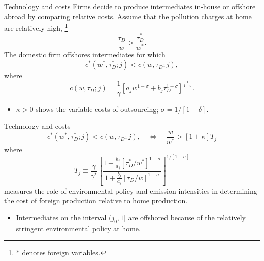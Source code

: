 \documentclass{beamer}
\begin{document}
\begin{frame}{Technology and costs}
	Firms decide to produce intermediates in-house or offshore abroad by comparing relative costs. Assume that the pollution charges at home are relatively high, \footnote{$*$ denotes foreign variables.}
	\begin{equation}
		\frac{\tau_D}{w}>\frac{\tau_D^*}{w^*}.
	\end{equation}
	\medskip
	The domestic firm offshores intermediates for which
	\begin{equation}
			[1+\kappa]c^*(w^*,\tau_D^*;j)<c(w,\tau_D;j),
	\end{equation}
	where
	\begin{equation}
		c(w,\tau_D;j) = \frac{1}{\gamma}\left[a_jw^{1-\sigma}+b_j\tau_D^{1-\sigma}\right]^{\frac{1}{1-\sigma}}.
	\end{equation}
	\begin{itemize}
		\item $\kappa>0$ shows the variable costs of outsourcing; $\sigma=1/[1-\delta]$.
	\end{itemize}
\end{frame}
\begin{frame}{Technology and costs}
	\begin{equation}
		[1+\kappa]c^*(w^*,\tau_D^*;j)<c(w,\tau_D;j),\quad \Leftrightarrow\quad\frac{w}{w^*}>\left[1+\kappa\right]T_j
	\end{equation}
	where
	\begin{equation}
		T_j\equiv \frac{\gamma}{\gamma^*}\left[\frac{1+\frac{b_j}{a_j}[\tau^*_D/w^*]^{1-\sigma}}{1+\frac{b_j}{a_j}[\tau_D/w]^{1-\sigma}}\right]^{1/[1-\sigma]}
	\end{equation}
	measures the role of environmental policy and emission intensities in determining the cost of foreign production relative to home production.
	\medskip
	\begin{itemize}
		\item Intermediates on the interval $(j_0,1]$ are offshored because of the relatively stringent environmental policy at home.
	\end{itemize}	
\end{frame}
\end{document}
